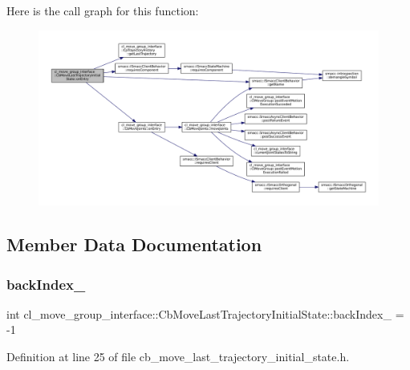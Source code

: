Here is the call graph for this function\+:
\nopagebreak
\begin{figure}[H]
\begin{center}
\leavevmode
\includegraphics[width=350pt]{classcl__move__group__interface_1_1CbMoveLastTrajectoryInitialState_ad51f4883ea1f7442875cda06c3d474c3_cgraph}
\end{center}
\end{figure}


\subsection{Member Data Documentation}
\mbox{\label{classcl__move__group__interface_1_1CbMoveLastTrajectoryInitialState_ac4056048a84431f4256beecd03b956b2}} 
\subsubsection{\texorpdfstring{back\+Index\+\_\+}{backIndex\_}}
{\footnotesize\ttfamily int cl\+\_\+move\+\_\+group\+\_\+interface\+::\+Cb\+Move\+Last\+Trajectory\+Initial\+State\+::back\+Index\+\_\+ = -\/1\hspace{0.3cm}{\ttfamily [private]}}



Definition at line 25 of file cb\+\_\+move\+\_\+last\+\_\+trajectory\+\_\+initial\+\_\+state.\+h.



